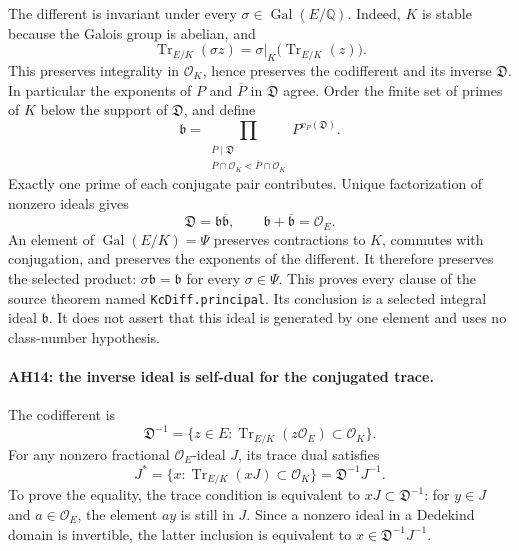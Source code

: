 The different is invariant under every $\sigma\in\operatorname{Gal}(E/\mathbb Q)$.
Indeed, $K$ is stable because the Galois group is abelian, and
\[
 \operatorname{Tr}_{E/K}(\sigma z)
       =\sigma|_K\bigl(\operatorname{Tr}_{E/K}(z)\bigr).
\]
This preserves integrality in $\mathcal O_K$, hence preserves the
codifferent and its inverse $\mathfrak D$. In particular the exponents
of $P$ and $\overline P$ in $\mathfrak D$ agree.
Order the finite set of primes of $K$ below the support of $\mathfrak D$,
and define
\[
 \mathfrak b=
 \prod_{\substack{P\mid\mathfrak D\\
              P\cap\mathcal O_K<\overline P\cap\mathcal O_K}}
                       P^{v_P(\mathfrak D)}.                  \tag{AH.32}
\]
Exactly one prime of each conjugate pair contributes. Unique factorization
of nonzero ideals gives
\[
 \mathfrak D=\mathfrak b\overline{\mathfrak b},\qquad
 \mathfrak b+\overline{\mathfrak b}=\mathcal O_E.                 \tag{AH.33}
\]
An element of $\operatorname{Gal}(E/K)=\Psi$ preserves contractions to
$K$, commutes with conjugation, and preserves the exponents of the
different. It therefore preserves the selected product:
$\sigma\mathfrak b=\mathfrak b$ for every $\sigma\in\Psi$.
This proves every clause of the source theorem named
\texttt{KcDiff.principal}. Its conclusion is a selected integral ideal
$\mathfrak b$. It does not assert that this ideal is generated by one
element and uses no class-number hypothesis.

\paragraph{AH14: the inverse ideal is self-dual for the conjugated trace.}
The codifferent is
\[
 \mathfrak D^{-1}
   =\{z\in E:\operatorname{Tr}_{E/K}(z\mathcal O_E)
                                      \subset\mathcal O_K\}.
\]
For any nonzero fractional $\mathcal O_E$-ideal $J$, its trace dual satisfies
\[
 J^*=\{x:\operatorname{Tr}_{E/K}(xJ)\subset\mathcal O_K\}
       =\mathfrak D^{-1}J^{-1}.                  \tag{AH.34}
\]
To prove the equality, the trace condition is equivalent to
$xJ\subset\mathfrak D^{-1}$: for $y\in J$ and $a\in\mathcal O_E$,
the element $ay$ is still in $J$. Since a nonzero ideal in a Dedekind domain
is invertible, the latter inclusion is equivalent to
$x\in\mathfrak D^{-1}J^{-1}$.

